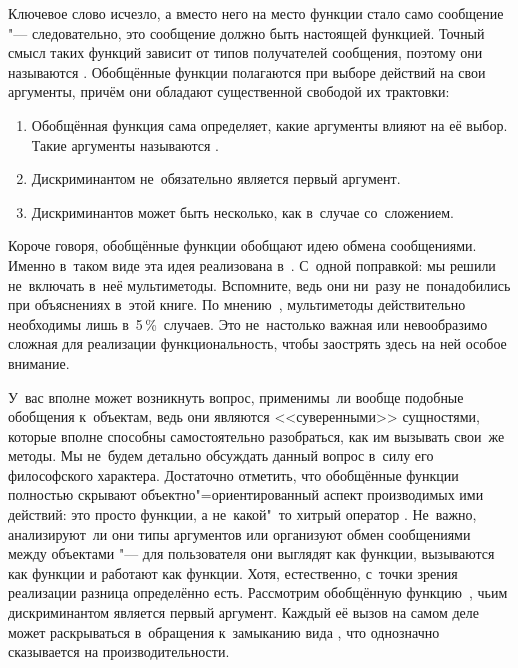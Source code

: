 Ключевое слово  исчезло, а вместо него на место функции стало само
сообщение "--- следовательно, это сообщение должно быть настоящей функцией.
Точный смысл таких функций зависит от типов получателей сообщения, поэтому они
называются . Обобщённые функции полагаются при выборе действий
на свои аргументы, причём они обладают существенной свободой их трактовки:

\begin{enumerate}
  \item Обобщённая функция сама определяет, какие аргументы влияют на её
        выбор. Такие аргументы называются .

  \item Дискриминантом не~обязательно является первый аргумент.

  \item Дискриминантов может быть несколько, как в~случае со~сложением.
\end{enumerate}

Короче говоря, обобщённые функции обобщают идею обмена сообщениями. Именно
в~таком виде эта идея реализована в~{\Meroonet}. С~одной поправкой: мы решили
не~включать в~неё мультиметоды. Вспомните, ведь они ни~разу не~понадобились при
объяснениях в~этой книге. По мнению~\cite{kr90}, мультиметоды действительно
необходимы лишь в~{5\,\%}~случаев. Это не~настолько важная или невообразимо
сложная для реализации функциональность, чтобы заострять здесь на ней особое
внимание.

У~вас вполне может возникнуть вопрос, применимы~ли вообще подобные обобщения
к~объектам, ведь они являются <<суверенными>> сущностями, которые вполне
способны самостоятельно разобраться, как им вызывать свои~же методы. Мы не~будем
детально обсуждать данный вопрос в~силу его философского характера. Достаточно
отметить, что обобщённые функции полностью скрывают объектно"=ориентированный
аспект производимых ими действий: это просто функции, а не~какой"~то хитрый
оператор . Не~важно, анализируют~ли они типы аргументов или организуют
обмен сообщениями между объектами "--- для пользователя они выглядят как
функции, вызываются как функции и работают как функции. Хотя, естественно,
с~точки зрения реализации разница определённо есть. Рассмотрим обобщённую
функцию~, чьим дискриминантом является первый аргумент. Каждый её вызов
 на самом деле может раскрываться в~обращения
к~замыканию вида ,
что однозначно сказывается на производительности.

